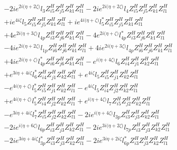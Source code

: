 \begin{align}
 &-2 i e^{2 i \Big(\eta +2 \zeta \Big)} l_3 Z_{{i 5}}^{H} Z_{{j 5}}^{H} Z_{{k 1}}^{H} Z_{{l 1}}^{H} -2 i e^{2 i \Big(\eta +2 \zeta \Big)} l_4 Z_{{i 5}}^{H} Z_{{j 5}}^{H} Z_{{k 1}}^{H} Z_{{l 1}}^{H} \nonumber \\ 
 &+i e^{4 i \zeta } l_5 Z_{{i 5}}^{H} Z_{{j 5}}^{H} Z_{{k 1}}^{H} Z_{{l 1}}^{H} +i e^{4 i \Big(\eta +\zeta \Big)} l_5^* Z_{{i 5}}^{H} Z_{{j 5}}^{H} Z_{{k 1}}^{H} Z_{{l 1}}^{H} \nonumber \\ 
 &+4 e^{2 i \Big(\eta +3 \zeta \Big)} l_{4p} Z_{{i 3}}^{H} Z_{{j 6}}^{H} Z_{{k 1}}^{H} Z_{{l 1}}^{H} -4 e^{2 i \Big(\eta +\zeta \Big)} l_{4p}^* Z_{{i 3}}^{H} Z_{{j 6}}^{H} Z_{{k 1}}^{H} Z_{{l 1}}^{H} \nonumber \\ 
 &-4 i e^{2 i \Big(\eta +2 \zeta \Big)} l_{1p} Z_{{i 6}}^{H} Z_{{j 6}}^{H} Z_{{k 1}}^{H} Z_{{l 1}}^{H} +4 i e^{2 i \Big(\eta +3 \zeta \Big)} l_{4p} Z_{{i 6}}^{H} Z_{{j 6}}^{H} Z_{{k 1}}^{H} Z_{{l 1}}^{H} \nonumber \\ 
 &+4 i e^{2 i \Big(\eta +\zeta \Big)} l_{4p}^* Z_{{i 6}}^{H} Z_{{j 6}}^{H} Z_{{k 1}}^{H} Z_{{l 1}}^{H} - e^{i \Big(\eta +4 \zeta \Big)} l_6 Z_{{i 4}}^{H} Z_{{j 1}}^{H} Z_{{k 2}}^{H} Z_{{l 1}}^{H} \nonumber \\ 
 &+e^{3 i \eta +4 i \zeta } l_6^* Z_{{i 4}}^{H} Z_{{j 1}}^{H} Z_{{k 2}}^{H} Z_{{l 1}}^{H} +e^{4 i \zeta } l_5 Z_{{i 5}}^{H} Z_{{j 1}}^{H} Z_{{k 2}}^{H} Z_{{l 1}}^{H} \nonumber \\ 
 &- e^{4 i \Big(\eta +\zeta \Big)} l_5^* Z_{{i 5}}^{H} Z_{{j 1}}^{H} Z_{{k 2}}^{H} Z_{{l 1}}^{H} - e^{4 i \zeta } l_5 Z_{{i 4}}^{H} Z_{{j 2}}^{H} Z_{{k 2}}^{H} Z_{{l 1}}^{H} \nonumber \\ 
 &+e^{4 i \Big(\eta +\zeta \Big)} l_5^* Z_{{i 4}}^{H} Z_{{j 2}}^{H} Z_{{k 2}}^{H} Z_{{l 1}}^{H} +e^{i \Big(\eta +4 \zeta \Big)} l_7 Z_{{i 5}}^{H} Z_{{j 2}}^{H} Z_{{k 2}}^{H} Z_{{l 1}}^{H} \nonumber \\ 
 &- e^{3 i \eta +4 i \zeta } l_7^* Z_{{i 5}}^{H} Z_{{j 2}}^{H} Z_{{k 2}}^{H} Z_{{l 1}}^{H} -2 i e^{i \Big(\eta +4 \zeta \Big)} l_{3p} Z_{{i 3}}^{H} Z_{{j 3}}^{H} Z_{{k 2}}^{H} Z_{{l 1}}^{H} \nonumber \\ 
 &-2 i e^{i \Big(\eta +6 \zeta \Big)} l_{6p} Z_{{i 3}}^{H} Z_{{j 3}}^{H} Z_{{k 2}}^{H} Z_{{l 1}}^{H} -2 i e^{3 i \Big(\eta +2 \zeta \Big)} l_{7p} Z_{{i 3}}^{H} Z_{{j 3}}^{H} Z_{{k 2}}^{H} Z_{{l 1}}^{H} \nonumber \\ 
 &-2 i e^{3 i \eta +4 i \zeta } l_{3p}^* Z_{{i 3}}^{H} Z_{{j 3}}^{H} Z_{{k 2}}^{H} Z_{{l 1}}^{H} -2 i e^{3 i \eta +2 i \zeta } l_{6p}^* Z_{{i 3}}^{H} Z_{{j 3}}^{H} Z_{{k 2}}^{H} Z_{{l 1}}^{H} \nonumber \\ 

\end{align}
